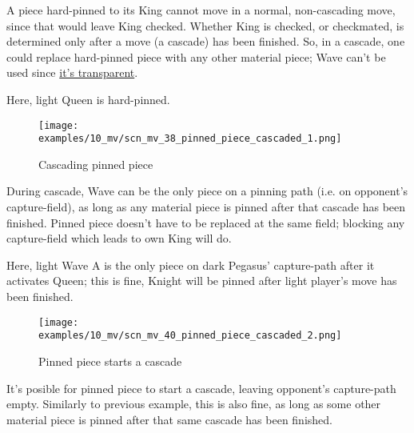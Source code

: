\vspace*{-0.5\baselineskip}
A piece hard-pinned to its King cannot move in a normal, non-cascading move, since
that would leave King checked. Whether King is checked, or checkmated, is determined
only after a move (a cascade) has been finished. So, in a cascade, one could replace
hard-pinned piece with any other material piece; Wave can't be used since
\hyperref[fig:scn_mv_07_wave_is_transparent]{it's transparent}.

Here, light Queen is hard-pinned.

\clearpage %

\vspace*{-2.1\baselineskip}
\noindent
\begin{figure}[!h]
\texttt{[image: examples/10\_mv/scn\_mv\_38\_pinned\_piece\_cascaded\_1.png]}
\vspace*{-1.3\baselineskip}
\caption{Cascading pinned piece}
\label{fig:scn_mv_38_pinned_piece_cascaded_1}
\end{figure}

\vspace*{-0.5\baselineskip}
During cascade, Wave can be the only piece on a pinning path (i.e. on opponent's
capture-field), as long as any material piece is pinned after that cascade has been
finished. Pinned piece doesn't have to be replaced at the same field; blocking any
capture-field which leads to own King will do.

Here, light Wave A is the only piece on dark Pegasus' capture-path after it activates
Queen; this is fine, Knight will be pinned after light player's move has been finished.

\clearpage %

\vspace*{-2.3\baselineskip}
\noindent
\begin{figure}[!h]
\texttt{[image: examples/10\_mv/scn\_mv\_40\_pinned\_piece\_cascaded\_2.png]}
\caption{Pinned piece starts a cascade}
\label{fig:scn_mv_40_pinned_piece_cascaded_2}
\end{figure}

It's posible for pinned piece to start a cascade, leaving opponent's capture-path
empty. Similarly to previous example, this is also fine, as long as some other
material piece is pinned after that same cascade has been finished.

